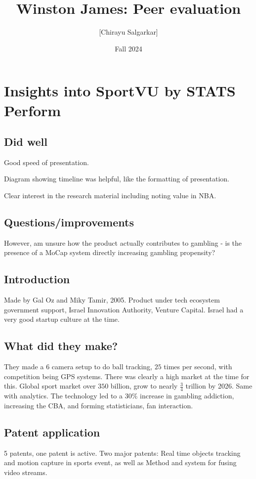 \documentclass[10pt, oneside]{article}
\title{Winston James: Peer evaluation}
\author{[Chirayu Salgarkar]}
\date{Fall 2024}
\begin{document}
\maketitle
\tableofcontents

\vspace{.25in}

\section{Insights into SportVU by STATS Perform}

\subsection{Did well}
Good speed of presentation.

Diagram showing timeline was helpful, like the formatting of presentation.

Clear interest in the research material including noting value in NBA. 


\subsection{Questions/improvements}
However, am unsure how the product actually contributes to gambling - is the presence of a MoCap system directly increasing gambling propensity?


\subsection{Introduction}
Made by Gal Oz and Miky Tamir, 2005. Product under tech ecosystem government support, Israel Innovation Authority, Venture Capital. Israel had a very good startup culture at the time. 

\subsection{What did they make?}
They made a $6$ camera setup to do ball tracking, $25$ times per second, with competition being GPS systems. There was clearly a high market at the time for this. Global sport market over $350$ billion, grow to nearly $\frac{3}{4}$ trillion by 2026. Same with analytics. The technology led to a $30\%$ increase in gambling addiction, increasing the CBA, and forming statisticians, fan interaction. 

\subsection{Patent application}
5 patents, one patent is active. Two major patents: Real time objects tracking and motion capture in sports event, as well as Method and system for fusing video streams. 
\end{document}
